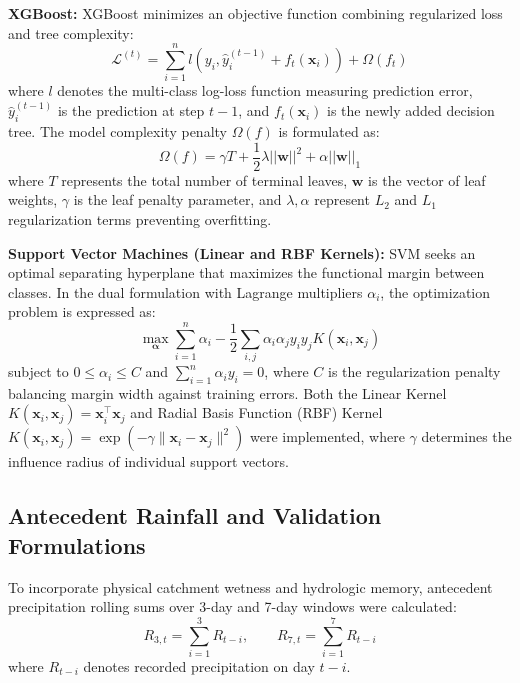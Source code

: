 \documentclass[conference]{IEEEtran}
\begin{document}
\textbf{XGBoost:} XGBoost minimizes an objective function combining regularized loss and tree complexity:
\begin{equation}
\mathcal{L}^{(t)} = \sum_{i=1}^{n} l\left(y_i, \hat{y}_i^{(t-1)} + f_t(\mathbf{x}_i)\right) + \Omega(f_t)
\label{eq:xgboost_obj}
\end{equation}
where $l$ denotes the multi-class log-loss function measuring prediction error, $\hat{y}_i^{(t-1)}$ is the prediction at step $t-1$, and $f_t(\mathbf{x}_i)$ is the newly added decision tree. The model complexity penalty $\Omega(f)$ is formulated as:
\begin{equation}
\Omega(f) = \gamma T + \frac{1}{2} \lambda ||\mathbf{w}||^2 + \alpha ||\mathbf{w}||_1
\label{eq:xgboost_reg}
\end{equation}
where $T$ represents the total number of terminal leaves, $\mathbf{w}$ is the vector of leaf weights, $\gamma$ is the leaf penalty parameter, and $\lambda, \alpha$ represent $L_2$ and $L_1$ regularization terms preventing overfitting.

\textbf{Support Vector Machines (Linear and RBF Kernels):} SVM seeks an optimal separating hyperplane that maximizes the functional margin between classes. In the dual formulation with Lagrange multipliers $\alpha_i$, the optimization problem is expressed as:
\begin{equation}
\max_{\boldsymbol{\alpha}} \sum_{i=1}^{n}\alpha_i - \frac{1}{2}\sum_{i,j}\alpha_i\alpha_j y_i y_j K(\mathbf{x}_i, \mathbf{x}_j)
\label{eq:svm_dual}
\end{equation}
subject to $0 \le \alpha_i \le C$ and $\sum_{i=1}^{n} \alpha_i y_i = 0$, where $C$ is the regularization penalty balancing margin width against training errors. Both the Linear Kernel $K(\mathbf{x}_i, \mathbf{x}_j) = \mathbf{x}_i^\top \mathbf{x}_j$ and Radial Basis Function (RBF) Kernel $K(\mathbf{x}_i, \mathbf{x}_j) = \exp(-\gamma \|\mathbf{x}_i - \mathbf{x}_j\|^2)$ were implemented, where $\gamma$ determines the influence radius of individual support vectors.

\subsection{Antecedent Rainfall and Validation Formulations}
To incorporate physical catchment wetness and hydrologic memory, antecedent precipitation rolling sums over 3-day and 7-day windows were calculated:
\begin{equation}
R_{3,t} = \sum_{i=1}^{3} R_{t-i}, \qquad R_{7,t} = \sum_{i=1}^{7} R_{t-i}
\label{eq:antecedent_lags}
\end{equation}
where $R_{t-i}$ denotes recorded precipitation on day $t-i$.
\end{document}
